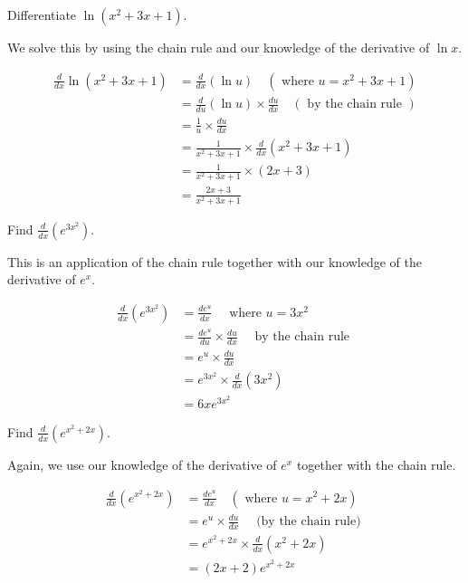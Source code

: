 \begin{example}

    Differentiate \(\ln \left(x^2+3 x+1\right)\).
\end{example}

\begin{solution} We solve this by using the chain rule and our knowledge of the derivative of \(\ln x\).

    \[
    \begin{aligned}
    \frac{d}{d x} \ln\left(x^2+3 x+1\right) & =\frac{d}{d x}\left(\ln u\right) \quad\left(\text { where } u=x^2+3 x+1\right) \\
    & =\frac{d}{d u}\left(\ln u\right) \times \frac{d u}{d x} \quad(\text { by the chain rule }) \\
    & =\frac{1}{u} \times \frac{d u}{d x} \\
    & =\frac{1}{x^2+3 x+1} \times \frac{d}{d x}\left(x^2+3 x+1\right) \\
    & =\frac{1}{x^2+3 x+1} \times(2 x+3) \\
    & =\frac{2 x+3}{x^2+3 x+1}
    \end{aligned}
    \]

\end{solution}


\begin{example}
    
Find \(\frac{d}{d x}\left(e^{3 x^2}\right)\).
\end{example}
\begin{solution} This is an application of the chain rule together with our knowledge of the derivative of \(e^x\).

\[
\begin{aligned}
\frac{d}{d x}\left(e^{3 x^2}\right) & =\frac{d e^u}{d x} \quad \text { where } u=3 x^2 \\
& =\frac{d e^u}{d u} \times \frac{d u}{d x} \quad \text { by the chain rule } \\
& =e^u \times \frac{d u}{d x} \\
& =e^{3 x^2} \times \frac{d}{d x}\left(3 x^2\right) \\
& =6 x e^{3 x^2}
\end{aligned}
\]
\end{solution}


\begin{example}

Find \(\frac{d}{d x}\left(e^{x^2+2 x}\right)\).
\end{example}
\begin{solution} Again, we use our knowledge of the derivative of \(e^x\) together with the chain rule.

\[
\begin{aligned}
\frac{d}{d x}\left(e^{x^2+2 x}\right) & =\frac{d e^{u}}{d x} \quad\left(\text { where } u=x^2+2 x\right) \\
& =e^{u} \times \frac{d u}{d x} \quad \text { (by the chain rule) } \\
& =e^{x^2+2 x} \times \frac{d}{d x}\left(x^2+2 x\right) \\
& =\left(2x+2\right)e^{x^2+2 x}
\end{aligned}
\]
\end{solution}


